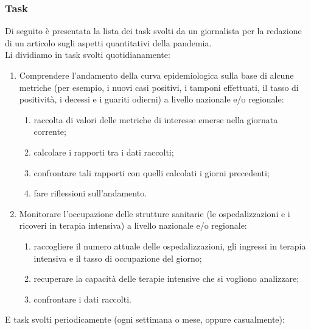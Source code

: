 \subsubsection{Task}
\label{sss:task}
Di seguito è presentata la lista dei task svolti da un giornalista per la redazione di un articolo sugli aspetti quantitativi della pandemia.\\
Li dividiamo in task svolti quotidianamente:
\begin{enumerate}
    \item Comprendere l'andamento della curva epidemiologica sulla base di alcune metriche (per esempio, i nuovi casi positivi, i tamponi effettuati, il tasso di positività, i decessi e i guariti odierni) a livello nazionale e/o regionale:
    \begin{enumerate}[label=\alph*.]
        \item raccolta di valori delle metriche di interesse emerse nella giornata corrente;
        \item calcolare i rapporti tra i dati raccolti;
        \item confrontare tali rapporti con quelli calcolati i giorni precedenti;
        \item fare riflessioni sull'andamento.
    \end{enumerate}
    \item Monitorare l'occupazione delle strutture sanitarie (le ospedalizzazioni e i ricoveri in terapia intensiva) a livello nazionale e/o regionale:
    \begin{enumerate}[label=\alph*.]
        \item raccogliere il numero attuale delle ospedalizzazioni, gli ingressi in terapia intensiva e il tasso di occupazione del giorno;
        \item recuperare la capacità delle terapie intensive che si vogliono analizzare;
        \item confrontare i dati raccolti.
    \end{enumerate}
\end{enumerate}
E task svolti periodicamente (ogni settimana o mese, oppure casualmente):
